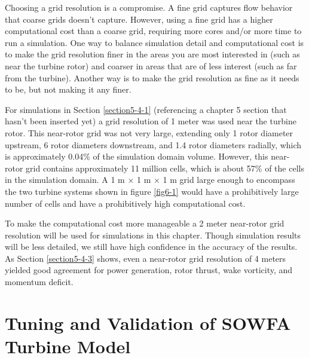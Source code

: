 Choosing a grid resolution is a compromise. A fine grid captures flow behavior that coarse grids doesn't capture. However, using a fine grid has a higher computational cost than a coarse grid, requiring more cores and/or more time to run a simulation. One way to balance simulation detail and computational cost is to make the grid resolution finer in the areas you are most interested in (such as near the turbine rotor) and coarser in areas that are of less interest (such as far from the turbine). Another way is to make the grid resolution as fine as it needs to be, but not making it any finer. 

For simulations in Section \ref{section5-4-1} (referencing a chapter 5 section that hasn't been inserted yet) a grid resolution of 1 meter was used near the turbine rotor. This near-rotor grid was not very large, extending only 1 rotor diameter upstream, 6 rotor diameters downstream, and 1.4 rotor diameters radially, which is approximately 0.04\% of the simulation domain volume. However, this near-rotor grid contains approximately 11 million cells, which is about 57\% of the cells in the simulation domain. A 1 m $\times$ 1 m $\times$ 1 m grid large enough to encompass the two turbine systems shown in figure \ref{fig6-1} would have a prohibitively large number of cells and have a prohibitively high computational cost. 

To make the computational cost more manageable a 2 meter near-rotor grid resolution will be used for simulations in this chapter. Though simulation results will be less detailed, we still have high confidence in the accuracy of the results. As Section \ref{section5-4-3} shows, even a near-rotor grid resolution of 4 meters yielded good agreement for power generation, rotor thrust, wake vorticity, and momentum deficit.  


\section{Tuning and Validation of SOWFA Turbine Model} \label{section6-4}

